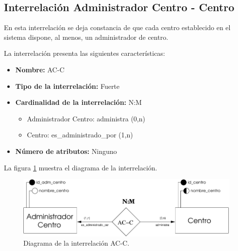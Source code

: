 \subsection{Interrelación Administrador Centro - Centro}

   \begin{description}
      \item[Definición] En esta interrelación se deja constancia de que cada
      centro establecido en el sistema dispone, al menos, un administrador de
      centro.

      \item[Características] La interrelación presenta las siguientes
                             características:

         \begin{itemize}
            \item \textbf{Nombre:} AC-C
            \item \textbf{Tipo de la interrelación:} Fuerte
            \item \textbf{Cardinalidad de la interrelación:} N:M
                  \begin{itemize}
                     \item Administrador Centro: administra (0,n)
                     \item Centro: es\_administrado\_por (1,n)
                  \end{itemize}
            \item \textbf{Número de atributos:} Ninguno
         \end{itemize}

      \item[Diagrama] La figura \ref{diagramaAC-C} muestra el diagrama de la
                      interrelación.
      \item \begin{figure}[!ht]
            \begin{center}
            \includegraphics[]{07.Modelo_Entidad-Interrelacion/7.3.Analisis_Interrelaciones/diagramas/AC-C.pdf}
            \caption{Diagrama de la interrelación AC-C.}
            \label{diagramaAC-C}
            \end{center}
         \end{figure}


\end{description}
